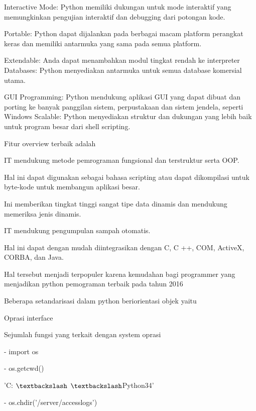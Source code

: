 \noindent 
Interactive Mode: Python memiliki dukungan untuk mode interaktif yang memungkinkan pengujian interaktif dan debugging dari potongan kode. \par
\noindent 
Portable: Python dapat dijalankan pada berbagai macam platform perangkat keras dan memiliki antarmuka yang sama pada semua platform. \par
\noindent 
Extendable: Anda dapat menambahkan modul tingkat rendah ke interpreter Databases: Python menyediakan antarmuka untuk semua database komersial utama. \par
\noindent 
GUI Programming: Python mendukung aplikasi GUI yang dapat dibuat dan porting ke banyak panggilan sistem, perpustakaan dan sistem jendela, seperti Windows Scalable: Python menyediakan struktur dan dukungan yang lebih baik untuk program besar dari shell scripting. \par
\vspace{12pt}
\noindent 
Fitur overview terbaik adalah  \par
\noindent 
IT mendukung metode pemrograman fungsional dan terstruktur serta OOP. \par
\noindent 
Hal ini dapat digunakan sebagai bahasa scripting atau dapat dikompilasi untuk byte-kode untuk membangun aplikasi besar. \par
\noindent 
Ini memberikan tingkat tinggi sangat tipe data dinamis dan mendukung memeriksa jenis dinamis. \par
\noindent 
IT mendukung pengumpulan sampah otomatis. \par
\noindent 
Hal ini dapat dengan mudah diintegrasikan dengan C, C ++, COM, ActiveX, CORBA, dan Java. \par
\noindent 
Hal tersebut menjadi terpopuler karena kemudahan bagi programmer yang menjadikan python pemograman terbaik pada tahun 2016  \par
\noindent 
Beberapa setandarisasi dalam python beriorientasi objek yaitu \par
\noindent 
Oprasi interface \par
\noindent 
Sejumlah fungsi yang terkait dengan system oprasi \par
\noindent 
- import os \par
\vspace{12pt}
\noindent 
- os.getcwd()~~~~~  \par
\noindent 
'C: $  \textbackslash  $ $  \textbackslash  $Python34' \par
\vspace{12pt}
\noindent 
- os.chdir('/server/accesslogs') \par

